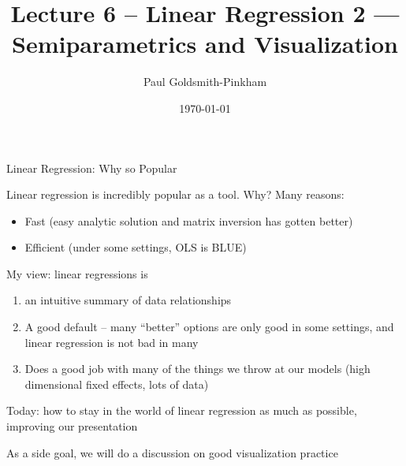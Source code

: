 \documentclass{tufte-handout}
\title{Lecture 6 -- Linear Regression 2 --- Semiparametrics and Visualization}
\author{Paul Goldsmith-Pinkham}
\date{\today}
\theoremstyle{break}
\begin{document}
\maketitle
Linear Regression: Why so Popular

Linear regression is incredibly popular as a tool. Why? 
 Many reasons:
    \begin{itemize}
    \item Fast (easy analytic solution and matrix inversion has gotten better)
    \item Efficient (under some settings, OLS is BLUE)
    \end{itemize}

    My view: linear regressions is
    \begin{enumerate}
    \item an intuitive summary of data relationships
    \item A good default -- many ``better'' options are only good in
      some settings, and linear regression is not bad in many
    \item Does a good job with many of the things we throw at our
      models (high dimensional fixed effects, lots of data)
    \end{enumerate}
Today: how to stay in the world of linear regression as much
    as possible, improving our presentation
 
    As a side goal, we will do a discussion on good visualization practice
\end{document}
